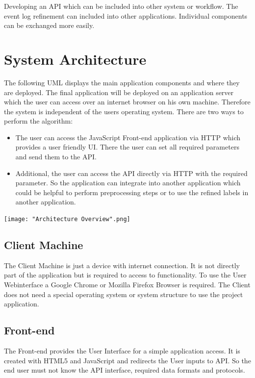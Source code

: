 \documentclass[notitlepage]{article}
\begin{document}
\begin{flushleft}
Developing an API which can be included into other system or workflow. The event log refinement can included into other applications. 
Individual components can be exchanged more easily.

\section{System Architecture}
The following UML displays the main application components and where they are deployed. The final application will be deployed on an application server which the user can access over an internet browser on his own machine. Therefore the system is independent of the users operating system. There are two ways to perform the 
algorithm:

\begin{itemize}
	\item The user can access the JavaScript Front-end application via HTTP which provides a user friendly UI. There the user can set all required parameters and send them to the API.
	\item Additional, the user can access the API directly via HTTP with the required parameter. So the application can integrate into another application which could be helpful to perform preprocessing steps or to use the refined labels in another application.
\end{itemize}




\texttt{[image: "Architecture Overview".png]}

\subsection{Client Machine}
The Client Machine is just a device with internet connection. It is not directly part of the application but is required to access to functionality.
To use the User Webinterface a Google Chrome or Mozilla Firefox Browser is required. The Client does not need a special operating system or system structure to use the project application.

\subsection{Front-end}
The Front-end provides the User Interface for a simple application access. It is created with HTML5 and JavaScript and redirects the User inputs to API.
So the end user must not know the API interface, required data formats and protocols.


\end{flushleft}
\end{document}
